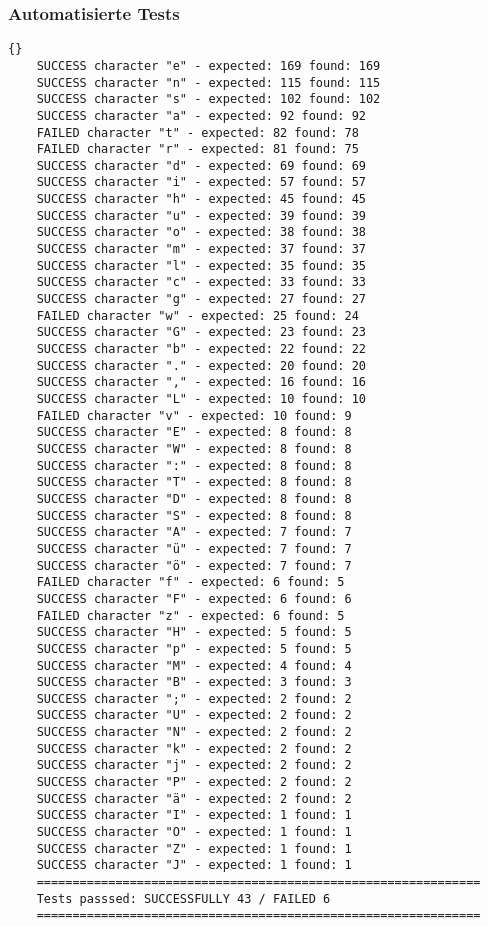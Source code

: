 \subsubsection{Automatisierte Tests}
\begin{lstlisting}{}
    SUCCESS character "e" - expected: 169 found: 169
    SUCCESS character "n" - expected: 115 found: 115
    SUCCESS character "s" - expected: 102 found: 102
    SUCCESS character "a" - expected: 92 found: 92
    FAILED character "t" - expected: 82 found: 78
    FAILED character "r" - expected: 81 found: 75
    SUCCESS character "d" - expected: 69 found: 69
    SUCCESS character "i" - expected: 57 found: 57
    SUCCESS character "h" - expected: 45 found: 45
    SUCCESS character "u" - expected: 39 found: 39
    SUCCESS character "o" - expected: 38 found: 38
    SUCCESS character "m" - expected: 37 found: 37
    SUCCESS character "l" - expected: 35 found: 35
    SUCCESS character "c" - expected: 33 found: 33
    SUCCESS character "g" - expected: 27 found: 27
    FAILED character "w" - expected: 25 found: 24
    SUCCESS character "G" - expected: 23 found: 23
    SUCCESS character "b" - expected: 22 found: 22
    SUCCESS character "." - expected: 20 found: 20
    SUCCESS character "," - expected: 16 found: 16
    SUCCESS character "L" - expected: 10 found: 10
    FAILED character "v" - expected: 10 found: 9
    SUCCESS character "E" - expected: 8 found: 8
    SUCCESS character "W" - expected: 8 found: 8
    SUCCESS character ":" - expected: 8 found: 8
    SUCCESS character "T" - expected: 8 found: 8
    SUCCESS character "D" - expected: 8 found: 8
    SUCCESS character "S" - expected: 8 found: 8
    SUCCESS character "A" - expected: 7 found: 7
    SUCCESS character "ü" - expected: 7 found: 7
    SUCCESS character "ö" - expected: 7 found: 7
    FAILED character "f" - expected: 6 found: 5
    SUCCESS character "F" - expected: 6 found: 6
    FAILED character "z" - expected: 6 found: 5
    SUCCESS character "H" - expected: 5 found: 5
    SUCCESS character "p" - expected: 5 found: 5
    SUCCESS character "M" - expected: 4 found: 4
    SUCCESS character "B" - expected: 3 found: 3
    SUCCESS character ";" - expected: 2 found: 2
    SUCCESS character "U" - expected: 2 found: 2
    SUCCESS character "N" - expected: 2 found: 2
    SUCCESS character "k" - expected: 2 found: 2
    SUCCESS character "j" - expected: 2 found: 2
    SUCCESS character "P" - expected: 2 found: 2
    SUCCESS character "ä" - expected: 2 found: 2
    SUCCESS character "I" - expected: 1 found: 1
    SUCCESS character "O" - expected: 1 found: 1
    SUCCESS character "Z" - expected: 1 found: 1
    SUCCESS character "J" - expected: 1 found: 1
    ==============================================================
    Tests passsed: SUCCESSFULLY 43 / FAILED 6
    ==============================================================
\end{lstlisting}

